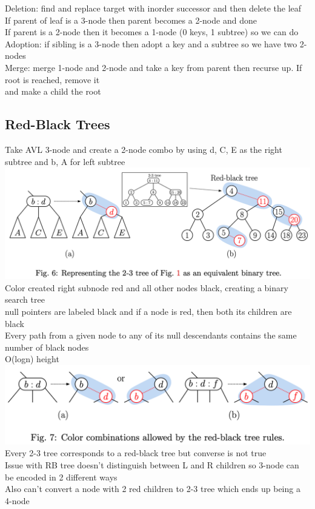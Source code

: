 \documentclass{article}
\begin{document}
  Deletion: find and replace target with inorder successor and then delete the leaf\\
  \indent If parent of leaf is a 3-node then parent becomes a 2-node and done \\
  \indent If parent is a 2-node then it becomes a 1-node (0 keys, 1 subtree) so we can do \\
  \indent \indent Adoption: if sibling is a 3-node then adopt a key and a subtree so we have two 2-nodes \\
  \indent \indent Merge: merge 1-node and 2-node and take a key from parent then recurse up. If root is reached, remove it \\
  \indent \indent and make a child the root\\
  \newpage
  \subsection{Red-Black Trees}
  Take AVL 3-node and create a 2-node combo by using d, C, E as the right subtree and b, A for left subtree \\
  \includegraphics[width=\textwidth]{RBTree}
  \indent Color created right subnode red and all other nodes black, creating a binary search tree\\
  \indent null pointers are labeled black and if a node is red, then both its children are black \\
  \indent Every path from a given node to any of its null descendants contains the same number of black nodes\\
  \indent O(logn) height \\
  \includegraphics[width=\textwidth]{2-3ToRBTree}
  \indent Every 2-3 tree corresponds to a red-black tree but converse is not true \\
  \indent \indent Issue with RB tree doesn't distinguish between L and R children so 3-node can be encoded in 2 different ways\\
  \indent \indent Also can't convert a node with 2 red children to 2-3 tree which ends up being a 4-node\\
  \newpage
\end{document}
